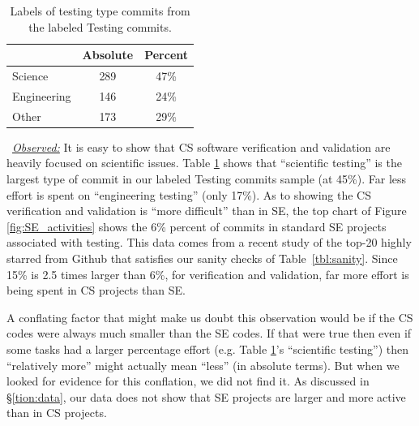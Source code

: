 \documentclass[sigconf,review,anonymous]{acmart}
\begin{document}
\begin{table}
\caption{Labels of testing type commits from the labeled Testing commits.}\label{tbl:testing}
\small \begin{tabular}{l|c|c}
\multicolumn{1}{c|}{} & \multicolumn{1}{c|}{Absolute} & \multicolumn{1}{c}{Percent}\\
\hline
Science & 289 & 47\% \\
Engineering & 146 & 24\% \\
Other & 173 & 29\% 
\end{tabular}
\end{table}\noindent ~\textit{\underline{Observed:}}
It is easy to show that CS software verification and validation are heavily focused on scientific issues.
Table \ref{tbl:testing} shows that ``scientific testing'' is the largest type of commit in our labeled Testing commits sample (at 45\%). Far less effort is spent on ``engineering testing'' (only 17\%). 
As to showing the CS verification and validation is ``more difficult'' than in SE,
the top chart of Figure \ref{fig:SE_activities} shows the 6\% percent of commits in standard SE projects associated with testing. This data comes from a recent study \cite{tu2019better} of the top-20 highly starred from Github that satisfies our sanity checks of Table~\ref{tbl:sanity}.
Since 15\% is 2.5 times larger than 6\%, for verification and validation, 
far more effort is being spent in CS projects than SE.

A conflating factor that might make us doubt this observation would be if the CS codes were always much smaller than the SE codes. If that were true then even if some tasks had a larger percentage effort 
(e.g. Table \ref{tbl:testing}'s ``scientific testing'') then  ``relatively more'' might actually
mean ``less'' (in absolute terms). 
But when we looked for evidence for this conflation, we did not find it.
As discussed in \S\ref{tion:data},
our data does not show that  SE projects are larger and more active
than in CS projects.


\end{document}
